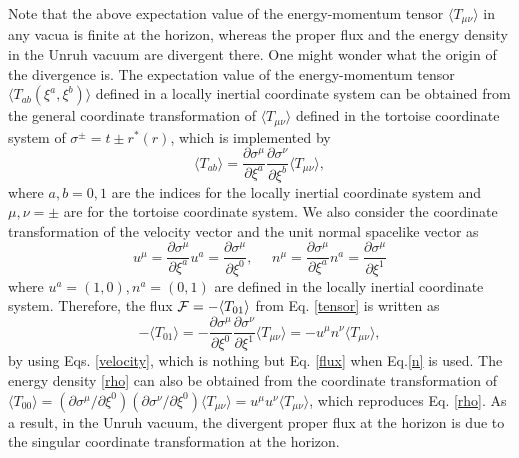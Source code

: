 \documentclass[aps,preprint,a4paper,showpacs,showkeys,superscriptaddress]{revtex4-1}
\begin{document}
Note that the above expectation value
of the energy-momentum tensor $\langle T_{\mu\nu} \rangle$  in any vacua is finite at the horizon,
whereas the proper flux and the energy density in the Unruh vacuum are divergent there.
One might wonder what the origin of the divergence is.
The expectation value of the energy-momentum tensor
$\langle T_{ab}(\xi^a,\xi^b) \rangle$ defined in a locally inertial coordinate system
can be obtained from the general coordinate transformation of
$ \langle T_{\mu\nu} \rangle$ defined in the tortoise coordinate system of $\sigma^{\pm}=t \pm r^{*}(r)$,
which is implemented by
\begin{equation}
\langle T_{ab} \rangle=\frac{\partial \sigma^\mu}{\partial \xi^a}
\frac{\partial \sigma^\nu}{\partial \xi^b} \langle T_{\mu\nu} \rangle,
\label{tensor}
\end{equation}
where $a,b=0,1$ are the indices for the locally inertial coordinate system and
$\mu,\nu=\pm$ are for the tortoise coordinate system.
We also consider the coordinate transformation of the velocity vector and the unit normal spacelike vector as
\begin{equation}
u^\mu = \frac{\partial \sigma^\mu}{ \partial \xi^a } u^a=\frac{\partial \sigma^\mu}{ \partial \xi^0 },~~~~~~
n^\mu = \frac{\partial \sigma^\mu}{ \partial \xi^a } n^a=\frac{\partial \sigma^\mu}{ \partial \xi^1 } \label{velocity}
\end{equation}
where $u^a=(1,0), n^a=(0,1)$ are defined in the locally inertial coordinate system.
Therefore, the flux ${\cal{F}}=-\langle T_{01} \rangle$  from Eq. \eqref{tensor} is written as
\begin{equation}
-\langle T_{01} \rangle=-\frac{\partial \sigma^\mu}{\partial \xi^0} \frac{\partial
\sigma^\nu}{\partial \xi^1} \langle T_{\mu\nu} \rangle=-u^\mu n^\nu
\langle T_{\mu\nu} \rangle, \label{t01}
\end{equation}
by using Eqs. \eqref{velocity}, which is nothing but Eq. \eqref{flux} when Eq.\eqref{n} is used.
The energy density \eqref{rho} can also be obtained from the coordinate transformation of
$\langle T_{00} \rangle=(\partial \sigma^\mu /\partial \xi^0) (\partial \sigma^\nu /\partial \xi^0)
\langle T_{\mu\nu} \rangle=u^\mu u^\nu
\langle T_{\mu\nu} \rangle$, which reproduces Eq. \eqref{rho}.
As a result, in the Unruh vacuum, the divergent proper flux
at the horizon is due to the singular coordinate transformation
at the horizon.

\end{document}
